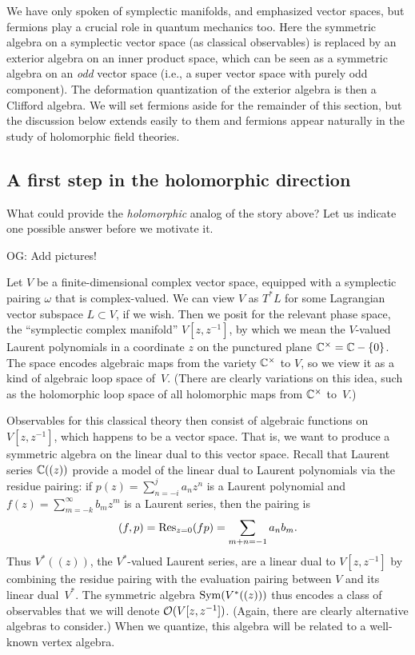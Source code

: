 \documentclass[11pt]{amsart}
\def\owen#1{{\textcolor{violet!65!black}{OG: {#1}}}}
\begin{document}
\begin{rmk}
We have only spoken of symplectic manifolds, and emphasized vector spaces,
but fermions play a crucial role in quantum mechanics too.
Here the symmetric algebra on a symplectic vector space (as classical observables) 
is replaced by an exterior algebra on an inner product space,
which can be seen as a symmetric algebra on an {\em odd} vector space
(i.e., a super vector space with purely odd component).
The deformation quantization of the exterior algebra is then a Clifford algebra.
We will set fermions aside for the remainder of this section,
but the discussion below extends easily to them and fermions appear naturally in the study of holomorphic field theories.
\end{rmk}

\subsection{A first step in the holomorphic direction}

What could provide the {\em holomorphic} analog of the story above?
Let us indicate one possible answer before we motivate it.

\owen{Add pictures!}

Let $V$ be a finite-dimensional complex vector space, equipped with a symplectic pairing $\omega$ that is complex-valued.
We can view $V$ as $T^* L$ for some Lagrangian vector subspace $L \subset V$, if we wish.
Then we posit for the relevant phase space, the ``symplectic complex manifold'' $V[z,z^{-1}]$,
by which we mean the $V$-valued Laurent polynomials in a coordinate $z$ on the punctured plane $\mathbb C^\times = \mathbb C -\{0\}$.
The space encodes algebraic maps from the variety $\mathbb C^\times$ to $V$,
so we view it as a kind of algebraic loop space of~$V$.
(There are clearly variations on this idea, such as the holomorphic loop space of all holomorphic maps from $\mathbb C^\times$ to~$V$.)

Observables for this classical theory then consist of algebraic functions on $V[z,z^{-1}]$, 
which happens to be a vector space.
That is, we want to produce a symmetric algebra on the linear dual to this vector space.
Recall that Laurent series $\mathbb C((z))$ provide a model of the linear dual to Laurent polynomials via the residue pairing: if $p(z) = \sum_{n = -i}^j a_n z^n$ is a Laurent polynomial and $f(z) = \sum_{m = -k}^\infty b_m z^m$ is a Laurent series, then the pairing is
\[
(f, p) = {\rm Res}_{z=0}(f p) = \sum_{m+n=-1} a_n b_m.
\]
Thus $V^* ((z))$, the $V^*$-valued Laurent series, are a linear dual to $V[z,z^{-1}]$ by combining the residue pairing with the evaluation pairing between $V$ and its linear dual~$V^*$.
The symmetric algebra $\operatorname{Sym}(V^* ((z)))$ thus encodes a class of observables that we will denote $\mathcal O(V[z,z^{-1}])$.
(Again, there are clearly alternative algebras to consider.)
When we quantize, this algebra will be related to a well-known vertex algebra.
\end{document}
